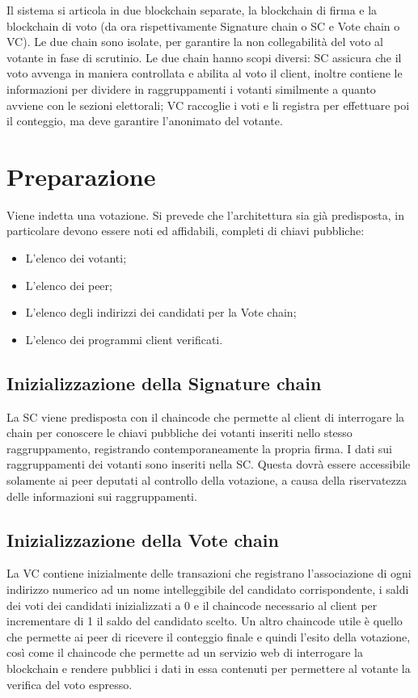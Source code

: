 Il sistema si articola in due blockchain separate, la blockchain di firma e la blockchain di voto (da ora rispettivamente Signature chain o SC e Vote chain o VC). Le due chain sono isolate, per garantire la non collegabilità del voto al votante in fase di scrutinio.
Le due chain hanno scopi diversi: SC assicura che il voto avvenga in maniera controllata e abilita al voto il client, inoltre contiene le informazioni per dividere in raggruppamenti i votanti similmente a quanto avviene con le sezioni elettorali; VC raccoglie i voti e li registra per effettuare poi il conteggio, ma deve garantire l’anonimato del votante.

\section{Preparazione}
	Viene indetta una votazione. Si prevede che l'architettura sia già predisposta, in particolare devono essere noti ed affidabili, completi di chiavi pubbliche:
	\begin{itemize}
		\item L'elenco dei votanti;
		\item L'elenco dei peer;
		\item L'elenco degli indirizzi dei candidati per la Vote chain;
		\item L'elenco dei programmi client verificati.
	\end{itemize}
	\subsection{Inizializzazione della Signature chain}
		La SC viene predisposta con il chaincode che permette al client di interrogare la chain per conoscere le chiavi pubbliche dei votanti inseriti nello stesso raggruppamento, registrando contemporaneamente la propria firma. I dati sui raggruppamenti dei votanti sono inseriti nella SC. Questa dovrà essere accessibile solamente ai peer deputati al controllo della votazione, a causa della riservatezza delle informazioni sui raggruppamenti.
	\subsection{Inizializzazione della Vote chain}
		La VC contiene inizialmente delle transazioni che registrano l'associazione di ogni indirizzo numerico ad un nome intelleggibile del candidato corrispondente, i saldi dei voti dei candidati inizializzati a 0 e il chaincode necessario al client per incrementare di 1 il saldo del candidato scelto. Un altro chaincode utile è quello che permette ai peer di ricevere il conteggio finale e quindi l'esito della votazione, così come il chaincode che permette ad un servizio web di interrogare la blockchain e rendere pubblici i dati in essa contenuti per permettere al votante la verifica del voto espresso.


